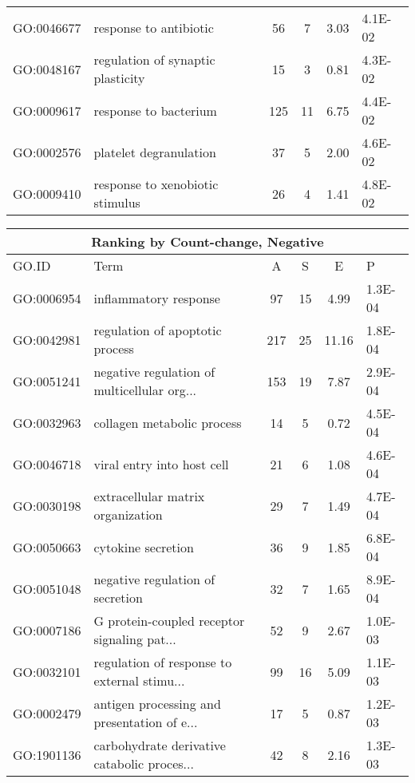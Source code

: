 \begin{table}[ht]
\begin{tabular}{llcccl}
  GO:0046677 & response to antibiotic &  56 &   7 & 3.03 & 4.1E-02 \\ 
  GO:0048167 & regulation of synaptic plasticity &  15 &   3 & 0.81 & 4.3E-02 \\ 
  GO:0009617 & response to bacterium & 125 &  11 & 6.75 & 4.4E-02 \\ 
  GO:0002576 & platelet degranulation &  37 &   5 & 2.00 & 4.6E-02 \\ 
  GO:0009410 & response to xenobiotic stimulus &  26 &   4 & 1.41 & 4.8E-02 \\ 
   \hline
\end{tabular}
\label{Count-change, Absolute}
\end{table}

\begin{table}[ht]
\centering
\begin{tabular}{llcccl}
\multicolumn{6}{c}{\bf Ranking by Count-change, Negative} \\
  \hline
GO.ID & Term & A & S & E & P \\ 
  \hline
GO:0006954 & inflammatory response &  97 &  15 & 4.99 & 1.3E-04 \\ 
  GO:0042981 & regulation of apoptotic process & 217 &  25 & 11.16 & 1.8E-04 \\ 
  GO:0051241 & negative regulation of multicellular org... & 153 &  19 & 7.87 & 2.9E-04 \\ 
  GO:0032963 & collagen metabolic process &  14 &   5 & 0.72 & 4.5E-04 \\ 
  GO:0046718 & viral entry into host cell &  21 &   6 & 1.08 & 4.6E-04 \\ 
  GO:0030198 & extracellular matrix organization &  29 &   7 & 1.49 & 4.7E-04 \\ 
  GO:0050663 & cytokine secretion &  36 &   9 & 1.85 & 6.8E-04 \\ 
  GO:0051048 & negative regulation of secretion &  32 &   7 & 1.65 & 8.9E-04 \\ 
  GO:0007186 & G protein-coupled receptor signaling pat... &  52 &   9 & 2.67 & 1.0E-03 \\ 
  GO:0032101 & regulation of response to external stimu... &  99 &  16 & 5.09 & 1.1E-03 \\ 
  GO:0002479 & antigen processing and presentation of e... &  17 &   5 & 0.87 & 1.2E-03 \\ 
  GO:1901136 & carbohydrate derivative catabolic proces... &  42 &   8 & 2.16 & 1.3E-03 \\ 

\end{tabular}
\end{table}
